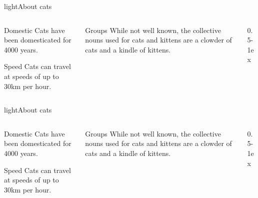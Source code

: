 \documentclass[aspectratio=169]{beamer}
\begin{document}
\begin{picframe}[lightbw]{light}{About cats}
  \begin{columns}[t,onlytextwidth]
    \begin{column}{0.25\textwidth}
      \begin{block}{Domestic}
        Cats have been domesticated for 4000 years.
      \end{block}
      \begin{block}{Speed}
        Cats can travel at speeds of up to 30km per hour.
      \end{block}
    \end{column}
    \begin{column}{0.25\textwidth}
      \begin{block}{Groups}
        While not well known, the collective nouns used for cats and kittens are a clowder of cats and a kindle of kittens.
        \vspace*{5ex}
      \end{block}
    \end{column}
    \begin{column}{0.5\textwidth-1ex}
    \end{column}
  \end{columns}
\end{picframe}

\begin{picframe}[light]{light}{About cats}
  \begin{columns}[t,onlytextwidth]
    \begin{column}{0.25\textwidth}
      \begin{block}{Domestic}
        Cats have been domesticated for 4000 years.
      \end{block}
      \begin{block}{Speed}
        Cats can travel at speeds of up to 30km per hour.
      \end{block}
    \end{column}
    \begin{column}{0.25\textwidth}
      \begin{block}{Groups}
        While not well known, the collective nouns used for cats and kittens are a clowder of cats and a kindle of kittens.
      \end{block}
    \end{column}
    \begin{column}{0.5\textwidth-1ex}
    \end{column}
  \end{columns}
\end{picframe}
\end{document}
